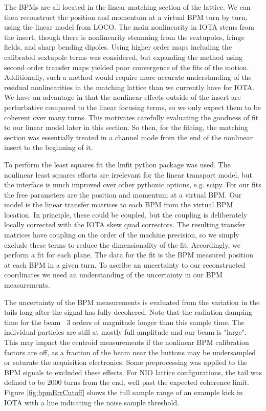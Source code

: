 The BPMs are all located in the linear matching section of the lattice. We can then reconstruct the position and momentum at a virtual BPM turn by turn, using the linear model from LOCO. The main nonlinearity in IOTA stems from the insert, though there is nonlinearity stemming from the sextupoles, fringe fields, and sharp bending dipoles. Using higher order maps including the calibrated sextupole terms was considered, but expanding the method using second order transfer maps yielded poor convergence of the fits of the motion. Additionally, such a method would require more accurate understanding of the residual nonlinearities in the matching lattice than we currently have for IOTA. We have an advantage in that the nonlinear effects outside of the insert are perturbative compared to the linear focusing terms, so we only expect them to be coherent over many turns. This motivates carefully evaluating the goodness of fit to our linear model later in this section. So then, for the fitting, the matching section was essentially treated in a channel mode from the end of the nonlinear insert to the beginning of it.

To perform the least squares fit the lmfit python package \cite{newvilleLMFITNonLinearLeastSquares2025} was used. The nonlinear least squares efforts are irrelevant for the linear transport model, but the interface is much improved over other pythonic options, e.g. scipy. For our fits the free parameters are the position and momentum at a virtual BPM. Our model is the linear transfer matrices to each BPM from the virtual BPM location. In principle, these could be coupled, but the coupling is deliberately locally corrected with the IOTA skew quad correctors. The resulting transfer matrices have coupling on the order of the machine precision, so we simply exclude these terms to reduce the dimensionality of the fit. Accordingly, we perform a fit for each plane. The data for the fit is the BPM measured position at each BPM in a given turn. To ascribe an uncertainty to our reconstructed coordinates we need an understanding of the uncertainty in our BPM measurements.

The uncertainty of the BPM measurements is evaluated from the variation in the tails long after the signal has fully decohered. Note that the radiation damping time for the beam ~3 orders of magnitude longer than this sample time. The individual particles are still at mostly full amplitude and our beam is "large". This may impact the centroid measurements if the nonlinear BPM calibration factors are off, as a fraction of the beam near the buttons may be undersampled or saturate the acquisition electronics. Some preprocessing was applied to the BPM signals to excluded these effects. For NIO lattice configurations, the tail was defined to be 2000 turns from the end, well past the expected coherence limit. Figure \ref{fig:bpmErrCutoff} shows the full sample range of an example kick in IOTA with a line indicating the noise sample threshold.

